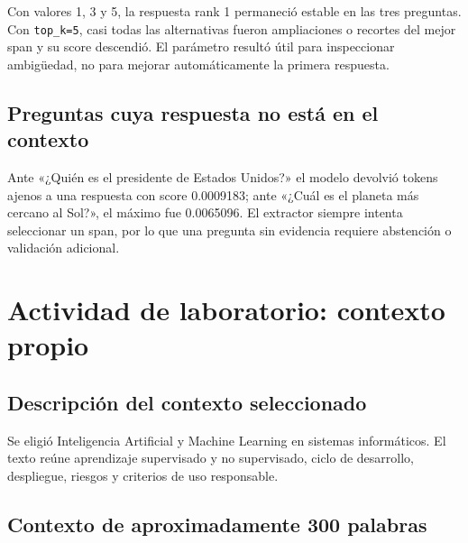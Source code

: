 \documentclass[12pt,letterpaper]{article}
\begin{document}
Con valores 1, 3 y 5, la respuesta rank 1 permaneció estable en las tres
preguntas. Con \texttt{top\_k=5}, casi todas las alternativas fueron
ampliaciones o recortes del mejor span y su score descendió. El parámetro
resultó útil para inspeccionar ambigüedad, no para mejorar automáticamente la
primera respuesta.

\subsection{Preguntas cuya respuesta no está en el contexto}

Ante «¿Quién es el presidente de Estados Unidos?» el modelo devolvió tokens ajenos a una
respuesta con score 0.0009183; ante «¿Cuál es el planeta más cercano al Sol?», el
máximo fue 0.0065096. El extractor siempre intenta seleccionar un span, por lo que
una pregunta sin evidencia requiere abstención o validación adicional.

\section{Actividad de laboratorio: contexto propio}

\subsection{Descripción del contexto seleccionado}

Se eligió Inteligencia Artificial y Machine Learning en sistemas informáticos.
El texto reúne aprendizaje supervisado y no supervisado, ciclo de desarrollo,
despliegue, riesgos y criterios de uso responsable.

\subsection{Contexto de aproximadamente 300 palabras}
\end{document}
